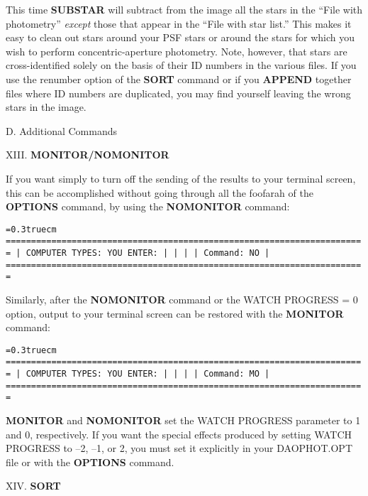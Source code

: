This time {\bf SUBSTAR} will subtract from the image all the stars
in the ``File with photometry'' {\it except\/} those that appear
in the ``File with star list.''  This makes it easy to clean out stars
around your PSF stars or around the stars for which you wish to perform
concentric-aperture photometry.  Note, however, that stars are
cross-identified solely on the basis of their ID numbers in the various
files.  If you use the renumber option of the {\bf SORT} command or
if you {\bf APPEND} together files where ID numbers are duplicated,
you may find yourself leaving the wrong stars in the image.

\vfill 
\eject 
\centerline{D.  Additional Commands} 
\noindent XIII.  {\bf MONITOR/NOMONITOR}

If you want simply to turn off the sending of the results to your
terminal screen, this can be accomplished without going through all the
foofarah of the {\bf OPTIONS} command, by using the {\bf NOMONITOR}
command:

\bigskip
{\noindent\obeylines\obeyspaces\frenchspacing\tt\baselineskip=0.3truecm
=======================================================================
| COMPUTER TYPES:                                  YOU ENTER:         |
|                                                                     |
| Command:                                         NO                 |
=======================================================================
}
\bigskip

\noindent Similarly, after the {\bf NOMONITOR} command or the WATCH
PROGRESS = 0 option, output to your terminal screen can be restored
with the {\bf MONITOR} command:

\bigskip
{\noindent\obeylines\obeyspaces\frenchspacing\tt\baselineskip=0.3truecm
=======================================================================
| COMPUTER TYPES:                                  YOU ENTER:         |
|                                                                     |
| Command:                                         MO                 |
=======================================================================
}
\bigskip

{\bf MONITOR} and {\bf NOMONITOR} set the WATCH PROGRESS parameter to 1
and 0, respectively.  If you want the special effects produced by
setting WATCH PROGRESS to --2, --1, or 2, you must set it explicitly in
your DAOPHOT.OPT file or with the {\bf OPTIONS} command.

\vfill
\eject
\noindent XIV.  {\bf SORT}

